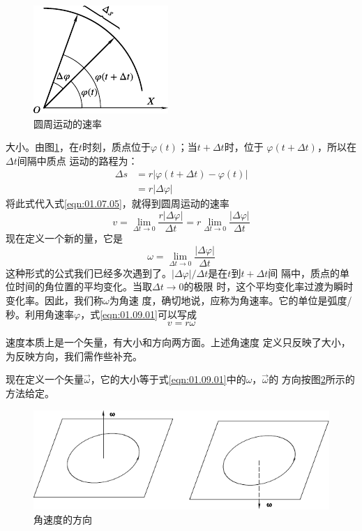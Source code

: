 \begin{figure}
  \vspace{-0.5em}
  \centering \small
  \includegraphics{figure/fig01.18}
  \caption{圆周运动的速率}
  \label{fig:01.18}
\end{figure}
\noindent 大小。由图\ref{fig:01.18}，在$t$时刻，质点位于$\varphi\left(t\right)$；当$t+\Delta t$时，位于
$\varphi\left(t+\Delta t\right)$，所以在$\Delta t$间隔中质点
运动的路程为：
\setlength{\mathindent}{2em}
\begin{equation*}
  \begin{aligned}
    \Delta s & =r|\varphi\left(t+\Delta t\right)-\varphi\left(t\right)| \\
             & =r|\Delta \varphi|
  \end{aligned}
\end{equation*}
将此式代入式\eqref{eqn:01.07.05}，就得到圆周运动的速率
\setlength{\mathindent}{6em}
\begin{equation}\label{eqn:01.09.01}
  v=\lim _{\Delta t \rightarrow 0} \frac{r|\Delta \varphi|}{\Delta t}=r \lim _{\Delta t \rightarrow 0} \frac{|\Delta \varphi|}{\Delta t}
\end{equation}
现在定义一个新的量，它是
\begin{equation}\label{eqn:01.09.02}
  \omega=\lim _{\Delta t \rightarrow 0} \frac{|\Delta \varphi|}{\Delta t}
\end{equation}
这种形式的公式我们已经多次遇到了。$|\Delta\varphi|/\Delta t$是在$t$到$t+\Delta t$间
隔中，质点的单位时间的角位置的平均变化。当取$\Delta t\rightarrow 0$的极限
时，这个平均变化率过渡为瞬时变化率。因此，我们称$\omega$为角速
度，确切地说，应称为角速率。它的单位是弧度/秒。利用角速率$\varphi$，式\eqref{eqn:01.09.01}可以写成
\begin{equation}\label{eqn:01.09.03}
  v=r\omega
\end{equation}

速度本质上是一个矢量，有大小和方向两方面。上述角速度
定义只反映了大小，为反映方向，我们需作些补充。

现在定义一个矢量$\vec{\omega}$，它的大小等于式\eqref{eqn:01.09.01}中的$\omega$，$ \vec{\omega}$的
方向按图\ref{fig:01.19}所示的方法给定。
\begin{figure}[!h]
  \includegraphics{figure/fig01.19}
  \caption{角速度的方向}
  \label{fig:01.19}
\end{figure}

